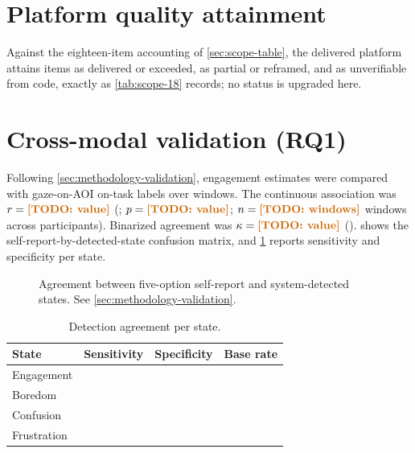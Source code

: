 \section{Platform quality attainment}
\label{sec:results-quality}

Against the eighteen-item accounting of \cref{sec:scope-table}, the
delivered platform attains  items as delivered or exceeded,
 as partial or reframed, and  as unverifiable from
code, exactly as \cref{tab:scope-18} records; no status is upgraded here.

\section{Cross-modal validation (RQ1)}
\label{sec:results-validation}

Following \cref{sec:methodology-validation}, engagement estimates were
compared with gaze-on-AOI on-task labels over  windows.
The continuous association was $r = \todo{value}$ (;
$p = \todo{value}$; $n = \todo{windows}$ windows across 
participants). Binarized agreement was $\kappa = \todo{value}$
().  shows the
self-report-by-detected-state confusion matrix, and
\cref{tab:results-validation} reports sensitivity and specificity per
state.

\begin{figure}[htbp]
\centering
{}
\caption[Self-report vs.\ detected-state confusion matrix]{Agreement
between five-option self-report and system-detected states. See
\cref{sec:methodology-validation}.}
\label{fig:validation-confusion}
\end{figure}

\begin{table}[htbp]
\centering
\small
\caption{Detection agreement per state.}
\label{tab:results-validation}
\begin{tabular}{@{}lccc@{}}
\toprule
State & Sensitivity & Specificity & Base rate \\
\midrule
Engagement & \todo{} & \todo{} & \todo{} \\
Boredom & \todo{} & \todo{} & \todo{} \\
Confusion & \todo{} & \todo{} & \todo{} \\
Frustration & \todo{} & \todo{} & \todo{} \\
\bottomrule
\end{tabular}
\end{table}

